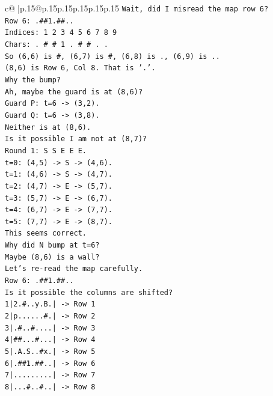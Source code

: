 \documentclass{article}
\begin{document}
{\begin{supertabular}{c@{$\;$}|p{.15\linewidth}@{}p{.15\linewidth}p{.15\linewidth}p{.15\linewidth}p{.15\linewidth}p{.15\linewidth}}
{{{\texttt{Wait, did I misread the map row 6?} \\
\texttt{Row 6: .\#\#1.\#\#..} \\
\texttt{Indices: 1 2 3 4 5 6 7 8 9} \\
\texttt{Chars: . \# \# 1 . \# \# . .} \\
\texttt{So (6,6) is \#, (6,7) is \#, (6,8) is ., (6,9) is ..} \\
\texttt{(8,6) is Row 6, Col 8. That is '.'.} \\
\texttt{Why the bump?} \\
\texttt{Ah, maybe the guard is at (8,6)?} \\
\texttt{Guard P: t=6 {-}> (3,2).} \\
\texttt{Guard Q: t=6 {-}> (3,8).} \\
\texttt{Neither is at (8,6).} \\
\texttt{Is it possible I am not at (8,7)?} \\
\texttt{Round 1: S S E E E.} \\
\texttt{t=0: (4,5) {-}> S {-}> (4,6).} \\
\texttt{t=1: (4,6) {-}> S {-}> (4,7).} \\
\texttt{t=2: (4,7) {-}> E {-}> (5,7).} \\
\texttt{t=3: (5,7) {-}> E {-}> (6,7).} \\
\texttt{t=4: (6,7) {-}> E {-}> (7,7).} \\
\texttt{t=5: (7,7) {-}> E {-}> (8,7).} \\
\texttt{This seems correct.} \\
\texttt{Why did N bump at t=6?} \\
\texttt{Maybe (8,6) is a wall?} \\
\texttt{Let's re{-}read the map carefully.} \\
\texttt{Row 6: .\#\#1.\#\#..} \\
\texttt{Is it possible the columns are shifted?} \\
\texttt{1|2.\#..y.B.| {-}> Row 1} \\
\texttt{2|p......\#.| {-}> Row 2} \\
\texttt{3|.\#..\#....| {-}> Row 3} \\
\texttt{4|\#\#...\#...| {-}> Row 4} \\
\texttt{5|.A.S..\#x.| {-}> Row 5} \\
\texttt{6|.\#\#1.\#\#..| {-}> Row 6} \\
\texttt{7|.........| {-}> Row 7} \\
\texttt{8|...\#..\#..| {-}> Row 8} \\
}}}
\end{supertabular}}
\end{document}
